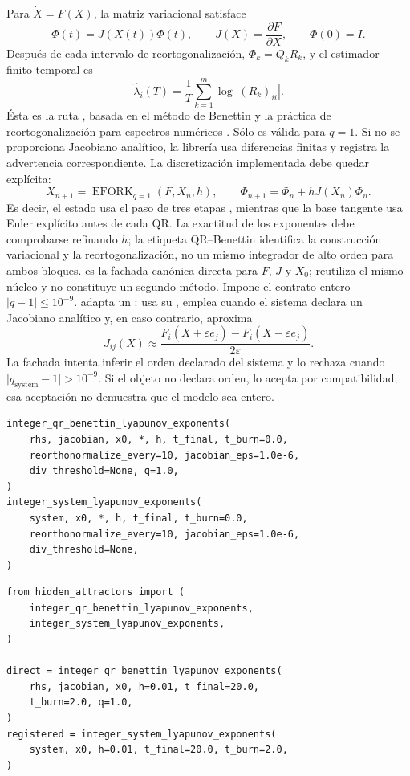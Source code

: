 Para \(\dot X=F(X)\), la matriz variacional satisface
\[
 \dot\Phi(t)=J(X(t))\Phi(t),\qquad
 J(X)=\frac{\partial F}{\partial X},\qquad \Phi(0)=I.
\]
Después de cada intervalo de reortogonalización,
\(\Phi_k=Q_kR_k\), y el estimador finito-temporal es
\[
 \widehat\lambda_i(T)=
 \frac1T\sum_{k=1}^{m}\log |(R_k)_{ii}|.
\]
Ésta es la ruta , basada en el método de
Benettin y la práctica de reortogonalización para espectros numéricos
\cite{Benettin1980a,Benettin1980b,Wolf1985}. Sólo es válida para \(q=1\).
Si no se proporciona Jacobiano analítico, la librería usa diferencias finitas
y registra la advertencia correspondiente. La discretización implementada
debe quedar explícita:
\[
 X_{n+1}=\operatorname{EFORK}_{q=1}(F,X_n,h),\qquad
 \Phi_{n+1}=\Phi_n+hJ(X_n)\Phi_n.
\]
Es decir, el estado usa el paso de tres etapas
, mientras que la base tangente usa Euler explícito
antes de cada QR. La exactitud de los exponentes debe comprobarse refinando
\(h\); la etiqueta QR--Benettin identifica la construcción variacional y la
reortogonalización, no un mismo integrador de alto orden para ambos bloques.
 es la fachada canónica
directa para \(F\), \(J\) y \(X_0\); reutiliza el mismo núcleo y no constituye
un segundo método. Impone el contrato entero
\(\lvert q-1\rvert\leq10^{-9}\).
 adapta un
: usa su , emplea
 cuando el sistema declara un Jacobiano analítico y,
en caso contrario, aproxima
\[
 J_{ij}(X)\approx
 \frac{F_i(X+\varepsilon e_j)-F_i(X-\varepsilon e_j)}
 {2\varepsilon}.
\]
La fachada intenta inferir el orden declarado del sistema y lo rechaza cuando
\(\lvert q_{\mathrm{system}}-1\rvert>10^{-9}\). Si el objeto no declara orden, lo acepta por
compatibilidad; esa aceptación no demuestra que el modelo sea entero.

\begin{verbatim}
integer_qr_benettin_lyapunov_exponents(
    rhs, jacobian, x0, *, h, t_final, t_burn=0.0,
    reorthonormalize_every=10, jacobian_eps=1.0e-6,
    div_threshold=None, q=1.0,
)
integer_system_lyapunov_exponents(
    system, x0, *, h, t_final, t_burn=0.0,
    reorthonormalize_every=10, jacobian_eps=1.0e-6,
    div_threshold=None,
)
\end{verbatim}

\begin{verbatim}
from hidden_attractors import (
    integer_qr_benettin_lyapunov_exponents,
    integer_system_lyapunov_exponents,
)

direct = integer_qr_benettin_lyapunov_exponents(
    rhs, jacobian, x0, h=0.01, t_final=20.0,
    t_burn=2.0, q=1.0,
)
registered = integer_system_lyapunov_exponents(
    system, x0, h=0.01, t_final=20.0, t_burn=2.0,
)
\end{verbatim}

